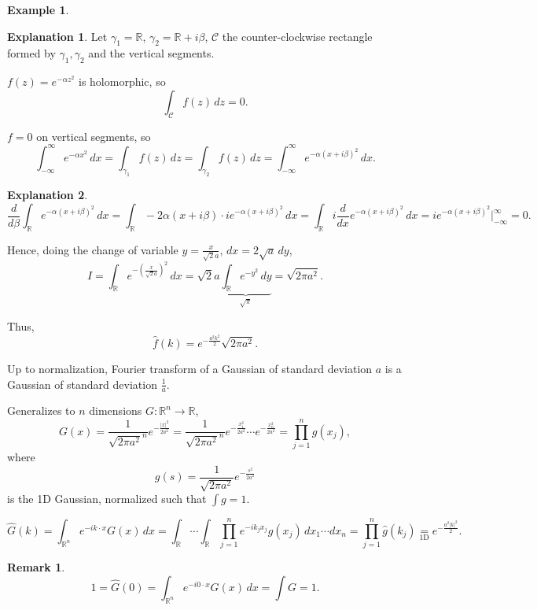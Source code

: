 \documentclass[12pt]{article}
\theoremstyle{definition}
\newtheorem*{remark}{Remark}
\newtheorem{explanation}{Explanation}
\newtheorem*{example*}{Example}
\begin{document}
\begin{example*}
\begin{explanation}
Let $\gamma_1=\mathbb{R}$, $\gamma_2=\mathbb{R}+i\beta$, $\mathcal{C}$ the counter-clockwise rectangle formed by $\gamma_1,\gamma_2$ and the vertical segments.

$f(z)=e^{-\alpha z^2}$ is holomorphic, so
\[\int_{\mathcal{C}}f(z)\,dz=0.\]

$f=0$ on vertical segments, so
\[\int_{-\infty}^{\infty}e^{-\alpha x^2}\,dx=\int_{\gamma_1}f(z)\,dz=\int_{\gamma_2}f(z)\,dz=\int_{-\infty}^{\infty}e^{-\alpha(x+i\beta)^2}\,dx.\]
\end{explanation}

\begin{explanation}
\[\frac{d}{d\beta}\int_{\mathbb{R}}e^{-\alpha(x+i\beta)^2}\,dx=\int_{\mathbb{R}}-2\alpha(x+i\beta)\cdot ie^{-\alpha(x+i\beta)^2}\,dx=\int_{\mathbb{R}}i\frac{d}{dx}e^{-\alpha(x+i\beta)^2}\,dx=ie^{-\alpha(x+i\beta)^2}\Big|_{-\infty}^{\infty}=0.\]

Hence, doing the change of variable $y=\frac{x}{\sqrt{2}a}$, $dx=2\sqrt{a}\,dy$,
\[I=\int_{\mathbb{R}}e^{-\left(\frac{x}{\sqrt{2}a}\right)^2}\,dx=\sqrt{2}a\underbrace{\int_{\mathbb{R}}e^{-y^2}\,dy}_{\sqrt{\pi}}=\sqrt{2\pi a^2}.\]

Thus,
\[\hat{f}(k)=e^{-\frac{a^2k^2}{2}}\sqrt{2\pi a^2}.\]
\end{explanation}

Up to normalization, Fourier transform of a Gaussian of standard deviation $a$ is a Gaussian of standard deviation $\frac{1}{a}$.

Generalizes to $n$ dimensions $G:\mathbb{R}^n\rightarrow\mathbb{R}$,
\[G(x)=\frac{1}{\sqrt{2\pi a^2}^n}e^{-\frac{|x|^2}{2a^2}}=\frac{1}{\sqrt{2\pi a^2}^n}e^{-\frac{x_1^2}{2a^2}}\cdots e^{-\frac{x_n^2}{2a^2}}=\prod_{j=1}^ng(x_j),\]
where
\[g(s)=\frac{1}{\sqrt{2\pi a^2}}e^{-\frac{s^2}{2a^2}}\]
is the 1D Gaussian, normalized such that $\int g=1$.

\[\widehat{G}(k)=\int_{\mathbb{R}^n}e^{-ik\cdot x}G(x)\,dx=\int_{\mathbb{R}}\cdots\int_{\mathbb{R}}\prod_{j=1}^ne^{-ik_jx_j}g(x_j)\,dx_1\cdots dx_n=\prod_{j=1}^n\hat{g}(k_j)\underset{\text{1D}}{=}e^{-\frac{a^2|k|^2}{2}}.\]

\begin{remark}
\[1=\widehat{G}(0)=\int_{\mathbb{R}^n}e^{-i0\cdot x}G(x)\,dx=\int G=1.\]
\end{remark}
\end{example*}

\end{document}
